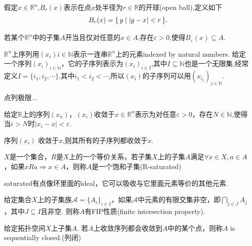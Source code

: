 \begin{definition}
\rm 假定$x \in \mathbb{R}^n$,$B_r(x)$表示在点$x$处半径为$r \in \mathbb{R}$的开球(open ball),定义如下\[B_r(x)=\{\,y\mid|y-x| < r\,\}.\]
\end{definition}

\begin{definition}
若某个$\mathbb{R}^n$中的子集$A$开当且仅对任意的$x \in A$,存在$\varepsilon > 0$,使得$B_\varepsilon(x) \subseteq A$.
\end{definition}


\begin{definition}
$\mathbb{R}^n$上序列用$(x_i)i\in\mathbb{N}$表示一连串$\mathbb{R}^n$上的元素indexed by natural numbers. 给定一个序列$(x_i)_{i\in\mathbb{N}}$，它的子序列表示为$(x_i)_{i \in I}$,其中$I \subseteq \mathbb{N}$也是一个无限集,经常定义$I = \{i_1,i_2,\cdots\}$,其中$i_1 < i_2 < \cdots$,所以$(x_i)$的子序列可以用$(x_{i_j})_{j \in \mathbb{N}}$.
\end{definition}

点列极限...

\begin{definition}
给定$\mathbb{R}$上的序列$(x_n)$，$(x_i)$收敛于$x \in \mathbb{R}^n$表示为对任意$\varepsilon > 0$，存在$N \in \mathbb{N}$,使得当$i > N$时$|x_i - x| < \varepsilon$.
\end{definition}

\begin{proposition}
序列$(x_i)$ 收敛于$x$,则其所有的子序列都收敛于$x$.
\end{proposition}

\begin{definition}[R-saturated]
$X$是一个集合，$R$是$X$上的一个等价关系，若子集$X$上的子集$A$满足$\forall x \in X, a \in A$，如果$xRa \Rightarrow x \in A$，则称$A$是一个饱和子集(R-saturated)
\end{definition}

saturated有点像环里面的ideal，它可以吸收与它里面元素等价的其他元素.

\begin{definition}
给定集合$X$上的子集族$\mathcal{A} = \{A_i\}_{i \in I}$，如果$\mathcal{A}$中元素的有限交集非空，即$\bigcap\limits_{j \in J} A_j$，其中$J \subseteq I$且非空. 则称$A$有FIP性质(finite intersection property).
\end{definition}

\begin{definition}
给定拓扑空间$X$上子集$A$. 若$A$上收敛序列都会收敛到$A$中的某个点，则称$A$ is sequentially closed.(列闭)
\end{definition}

